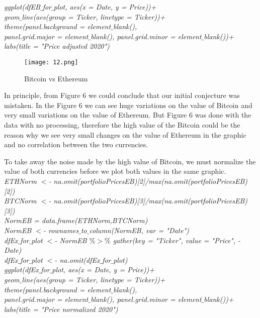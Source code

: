 \documentclass[14pt]{amsart}
\begin{document}
\noindent \textit{ggplot(dfEB$\_$for$\_$plot, aes(x = Date, y = Price))+}\\
\indent \textit{geom$\_$line(aes(group = Ticker, linetype = Ticker))+}\\
\indent \textit{theme(panel.background =  element$\_$blank(), }\\
\indent \textit{panel.grid.major = element$\_$blank(), panel.grid.minor = element$\_$blank())+}\\
\indent \textit{labs(title = "Price adjusted 2020")}\\

\begin{figure}[h!]
  \texttt{[image: 12.png]}
  \caption{Bitcoin vs Ethereum}
  \label{fig:boat1}
\end{figure}

In principle, from Figure 6 we could conclude that our initial conjecture was mistaken. In the Figure 6 we can see huge variations on the value of Bitcoin and very small variations on the value of Ethereum. But Figure 6 was done with the data with no processing, therefore the high value of the Bitcoin could be the reason why we see very small changes on the value of Ethereum in the graphic and no correlation between the two currencies.

To take away the noise made by the high value of Bitcoin, we must normalize the value of both currencies before we plot both values in the same graphic.\\

\noindent \textit{ETHNorm $<$- na.omit(portfolioPricesEB)[2]/max(na.omit(portfolioPricesEB)[2])}\\
\noindent \textit{BTCNorm $<$- na.omit(portfolioPricesEB)[3]/max(na.omit(portfolioPricesEB)[3])}\\
\noindent \textit{NormEB = data.frame(ETHNorm,BTCNorm)}\\

\noindent \textit{NormEB $<$- rownames$\_$to$\_$column(NormEB, var = "Date")}\\
\noindent \textit{dfEx$\_$for$\_$plot $<$- NormEB $\%>\%$ gather(key = "Ticker", value = "Price", -Date)}\\
\noindent \textit{dfEx$\_$for$\_$plot $<$- na.omit(dfEx$\_$for$\_$plot)}\\

\noindent \textit{ggplot(dfEx$\_$for$\_$plot, aes(x = Date, y = Price))+}\\
\indent \textit{geom$\_$line(aes(group = Ticker, linetype = Ticker))+}\\
\indent \textit{theme(panel.background =  element$\_$blank(),}\\
\indent \textit{panel.grid.major = element$\_$blank(), panel.grid.minor = element$\_$blank())+}\\
\indent \textit{labs(title = "Price normalized 2020")}
\end{document}
